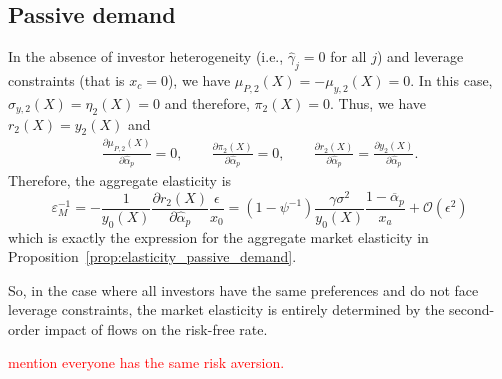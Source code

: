 \subsection{Passive demand}
In the absence of investor heterogeneity (i.e., $ \hat{\gamma}_j=0 $ for all $ j $) and leverage constraints (that is $ x_c=0 $), we have $ \mu_{P,2}(X)=-\mu_{y,2}(X)=0 $. In this case, $ \sigma_{y, 2}(X)=\eta_{2}(X)=0 $ and therefore, $ \pi_2(X)= 0$. Thus, we have $ r_2(X)=y_2(X) $ and  
\begin{align*}
	\frac{\partial\mu_{P,2}(X)}{\partial\hat{\alpha}_p}=0,
	\qquad\frac{\partial\pi_{2}(X)}{\partial\hat{\alpha}_p}=0,
	\qquad\frac{\partial r_{2}(X)}{\partial\hat{\alpha}_p}=\frac{\partial y_{2}(X)}{\partial\hat{\alpha}_p}.
\end{align*}
Therefore, the aggregate elasticity is
\[\varepsilon_M^{-1}=-\frac{1}{y_0(X)}\frac{\partial r_2(X)}{\partial \hat{\alpha}_p}\frac{\epsilon}{x_0}=
\left(1-\psi^{-1}\right) \frac{\gamma \sigma^{2}}{y_{0}(X)} \frac{1-\overline{\alpha}_{p}}{x_{a}}+\mathcal{O}\left(\epsilon^{2}\right)\]
which is exactly the expression for the aggregate market elasticity in Proposition~\ref{prop:elasticity_passive_demand}. 

So, in the case where all investors have the same preferences and do not face leverage constraints, the market elasticity is entirely determined by the second-order impact of flows on the risk-free rate.

\textcolor{red}{mention everyone has the same risk aversion.}

